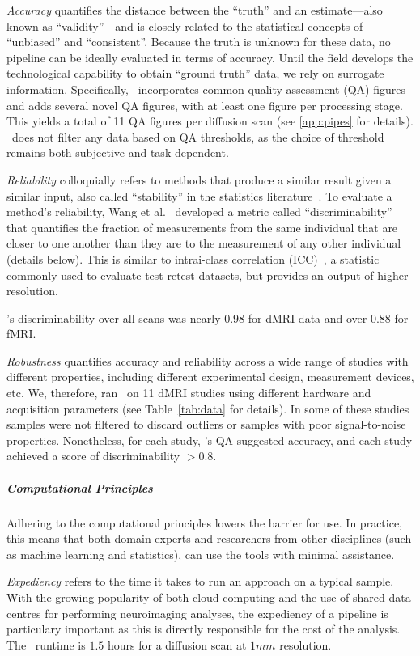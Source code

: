 \documentclass[11pt]{article}
\begin{document}
\begin{multicols}{2}
\emph{Accuracy} quantifies the distance between the ``truth'' and an estimate---also known as ``validity''---and is closely related to the statistical concepts of ``unbiased'' and ``consistent''.
Because the truth is unknown for these data, no pipeline can be ideally evaluated in terms of accuracy.
Until the field develops the technological capability to obtain ``ground truth'' data, we rely on surrogate information. 
Specifically, \ndmg~incorporates common quality assessment (QA) figures and adds several novel QA figures, with at least one figure per processing stage.
This yields a total of 11 QA figures per diffusion scan (see \ref{app:pipes} for details).
\ndmg~does not filter any data based on QA thresholds, as the choice of threshold remains both subjective and task dependent.

\emph{Reliability} colloquially refers to methods that produce a similar result given a similar input, also called ``stability'' in the statistics literature~\cite{Yu2013}.
To evaluate a method's reliability, Wang et al.~\cite{discriminability} developed a metric  called ``discriminability'' that quantifies the fraction of measurements from the same individual that are closer to one another than they are to the measurement of any other individual (details below).
This is similar to intrai-class correlation (ICC)~\cite{yen2002examining}, a statistic commonly used to evaluate test-retest datasets, but provides an output of higher resolution.

\ndmg's discriminability over all scans was nearly $0.98$ for dMRI data and over $0.88$ for fMRI. 

\emph{Robustness} quantifies accuracy and reliability across a wide range of studies with different properties, including different experimental design, measurement devices, etc.
We, therefore, ran \ndmg~on 11 dMRI studies using different hardware and acquisition parameters (see Table~\ref{tab:data} for details).
In some of these studies samples were not filtered to discard outliers or samples with poor signal-to-noise properties.
Nonetheless, for each study, \ndmg's QA suggested accuracy, and each study achieved a score of discriminability $>0.8$.

\subparagraph*{Computational Principles}
Adhering to the computational principles lowers the barrier for use.
In practice, this means that both domain experts and researchers from other disciplines (such as machine learning and statistics), can use the tools with minimal assistance.

\emph{Expediency} refers to the time it takes to run an approach on a typical sample.
With the growing popularity of both cloud computing and the use of shared data centres for performing neuroimaging analyses, the expediency of a pipeline is particulary important as this is directly responsible for the cost of the analysis.
The \ndmg~runtime is $1.5$ hours for a diffusion scan at $1 mm$ resolution. 


\end{multicols}
\end{document}
